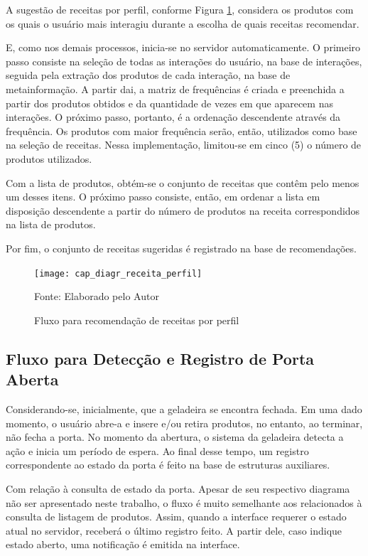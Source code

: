 A sugestão de receitas por perfil, conforme Figura \ref{fig:cap_diagr_receita_perfil}, considera os produtos com os quais o usuário mais interagiu durante a escolha de quais receitas recomendar. 

E, como nos demais processos, inicia-se no servidor automaticamente. 
O primeiro passo consiste na seleção de todas as interações do usuário, na base de interações, seguida pela extração dos produtos de cada interação, na base de metainformação. A partir dai, a matriz de frequências é criada e preenchida a partir dos produtos obtidos e da quantidade de vezes em que aparecem nas interações. O próximo passo, portanto, é a ordenação descendente através da frequência. Os produtos com maior frequência serão, então, utilizados como base na seleção de receitas. Nessa implementação, limitou-se em cinco (5) o número de produtos utilizados.

Com a lista de produtos, obtém-se o conjunto de receitas que contêm pelo menos um desses itens. O próximo passo consiste, então, em ordenar a lista em disposição descendente a partir do número de produtos na receita correspondidos na lista de produtos.

Por fim, o conjunto de receitas sugeridas é registrado na base de recomendações.

\begin{figure}[H]
    \caption{Fluxo para recomendação de receitas por perfil} 
    \label{fig:cap_diagr_receita_perfil}
    \texttt{[image: cap\_diagr\_receita\_perfil]}
    
    \footnotesize{Fonte: Elaborado pelo Autor}
\end{figure}

\subsection{Fluxo para Detecção e Registro de Porta Aberta}

Considerando-se, inicialmente, que a geladeira se encontra fechada. Em uma dado momento, o usuário abre-a e insere e/ou retira produtos, no entanto, ao terminar, não fecha a porta.  No momento da abertura, o sistema da geladeira detecta a ação e inicia um período de espera. Ao final desse tempo, um registro correspondente ao estado da porta é feito na base de estruturas auxiliares.

Com relação à consulta de estado da porta. Apesar de seu respectivo diagrama não ser apresentado neste trabalho, o fluxo é muito semelhante aos relacionados à consulta de listagem de produtos. Assim, quando a interface requerer o estado atual no servidor, receberá o último registro feito. A partir dele, caso indique estado aberto, uma notificação é emitida na interface.

